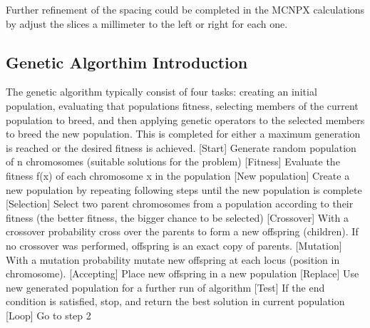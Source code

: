 


Further refinement of the spacing could be completed in the MCNPX calculations by adjust the slices a millimeter to the left or right for each one.
\subsection{Genetic Algorthim Introduction}
The genetic algorithm typically consist of four tasks: creating an initial population, evaluating that populations fitness, selecting members of the current population to breed, and then applying genetic operators to the selected members to breed the new population. 
This is completed for either a maximum generation is reached or the desired fitness is achieved. 
[Start] Generate random population of n chromosomes (suitable solutions for the problem)
[Fitness] Evaluate the fitness f(x) of each chromosome x in the population
[New population] Create a new population by repeating following steps until the new population is complete
[Selection] Select two parent chromosomes from a population according to their fitness (the better fitness, the bigger chance to be selected)
[Crossover] With a crossover probability cross over the parents to form a new offspring (children). If no crossover was performed, offspring is an exact copy of parents.
[Mutation] With a mutation probability mutate new offspring at each locus (position in chromosome).
[Accepting] Place new offspring in a new population
[Replace] Use new generated population for a further run of algorithm
[Test] If the end condition is satisfied, stop, and return the best solution in current population
[Loop] Go to step 2

